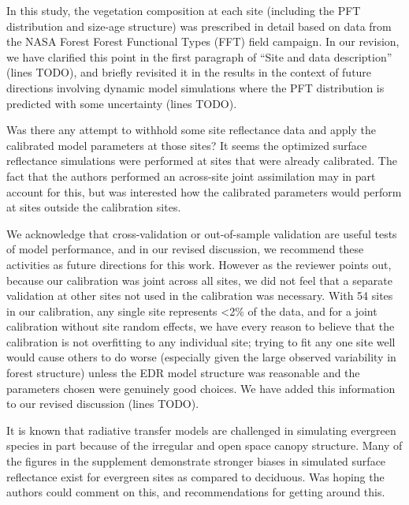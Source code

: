 In this study, the vegetation composition at each site (including the PFT distribution and size-age structure) was prescribed in detail based on data from the NASA Forest Forest Functional Types (FFT) field campaign.
In our revision, we have clarified this point in the first paragraph of ``Site and data description'' (lines TODO),
and briefly revisited it in the results in the context of future directions involving dynamic model simulations where the PFT distribution is predicted with some uncertainty (lines TODO).

\begin{reviewer}
  Was there any attempt to withhold some site reflectance data and apply the calibrated model parameters at those sites?
  It seems the optimized surface reflectance simulations were performed at sites that were already calibrated.
  The fact that the authors performed an across-site joint assimilation may in part account for this, but was interested how the calibrated parameters would perform at sites outside the calibration sites.
\end{reviewer}

We acknowledge that cross-validation or out-of-sample validation are useful tests of model performance, and in our revised discussion, we recommend these activities as future directions for this work.
However as the reviewer points out, because our calibration was joint across all sites, we did not feel that a separate validation at other sites not used in the calibration was necessary.
With 54 sites in our calibration, any single site represents <2\% of the data, and for a joint calibration without site random effects, we have every reason to believe that the calibration is not overfitting to any individual site;
trying to fit any one site well would cause others to do worse (especially given the large observed variability in forest structure) unless the EDR model structure was reasonable and the parameters chosen were genuinely good choices.
We have added this information to our revised discussion (lines TODO).

\begin{reviewer}
  It is known that radiative transfer models are challenged in simulating evergreen species in part because of the irregular and open space canopy structure.
  Many of the figures in the supplement demonstrate stronger biases in simulated surface reflectance exist for evergreen sites as compared to deciduous. Was hoping the authors could comment on this, and recommendations for getting around this.
\end{reviewer}

